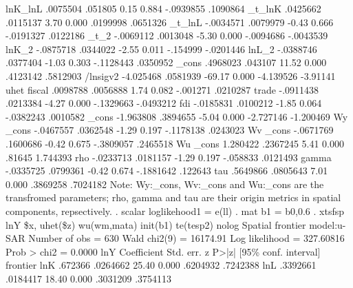      lnK_lnL {\VBAR}   .0075504    .051805     0.15   0.884    -.0939855    .1090864
      _t_lnK {\VBAR}   .0425662   .0115137     3.70   0.000     .0199998    .0651326
      _t_lnL {\VBAR}  -.0034571   .0079979    -0.43   0.666    -.0191327    .0122186
        _t_2 {\VBAR}  -.0069112   .0013048    -5.30   0.000    -.0094686   -.0043539
       lnK_2 {\VBAR}  -.0875718   .0344022    -2.55   0.011     -.154999   -.0201446
       lnL_2 {\VBAR}  -.0388746   .0377404    -1.03   0.303    -.1128443    .0350952
       _cons {\VBAR}   .4968023    .043107    11.52   0.000     .4123142    .5812903
    /lnsigv2 {\VBAR}  -4.025468   .0581939   -69.17   0.000    -4.139526    -3.91141
uhet         {\VBAR}
      fiscal {\VBAR}   .0098788   .0056888     1.74   0.082     -.001271    .0210287
       trade {\VBAR}  -.0911438   .0213384    -4.27   0.000    -.1329663   -.0493212
         fdi {\VBAR}  -.0185831   .0100212    -1.85   0.064    -.0382243    .0010582
       _cons {\VBAR}  -1.963808   .3894655    -5.04   0.000    -2.727146   -1.200469
Wy           {\VBAR}
       _cons {\VBAR}  -.0467557   .0362548    -1.29   0.197    -.1178138    .0243023
Wv           {\VBAR}
       _cons {\VBAR}  -.0671769   .1600686    -0.42   0.675    -.3809057    .2465518
Wu           {\VBAR}
       _cons {\VBAR}   1.280422   .2367245     5.41   0.000       .81645    1.744393
         rho {\VBAR}  -.0233713   .0181157    -1.29   0.197     -.058833    .0121493
       gamma {\VBAR}  -.0335725   .0799361    -0.42   0.674    -.1881642     .122643
         tau {\VBAR}   .5649866   .0805643     7.01   0.000     .3869258    .7024182
Note: Wy:_cons, Wv:_cons and Wu:_cons are the transfromed parameters;
      rho, gamma and tau are their origin metrics in spatial components, repsectively.
{\smallskip}
. scalar loglikehood1 =  e(ll)
{\smallskip}
. mat b1 = b0,0.6
{\smallskip}
. xtsfsp lnY \$x, uhet(\$z)  wu(wm,mata)  init(b1) te(tesp2)  nolog
{\smallskip}
Spatial frontier model:u-SAR                          Number of obs =      630
                                                      Wald chi2(9)  = 16174.91
Log likelihood = 327.60816                            Prob > chi2   =   0.0000
{\smallskip}
         lnY {\VBAR} Coefficient  Std. err.      z    P>|z|     [95\% conf. interval]
frontier     {\VBAR}
         lnK {\VBAR}    .672366   .0264662    25.40   0.000     .6204932    .7242388
         lnL {\VBAR}   .3392661   .0184417    18.40   0.000     .3031209    .3754113
